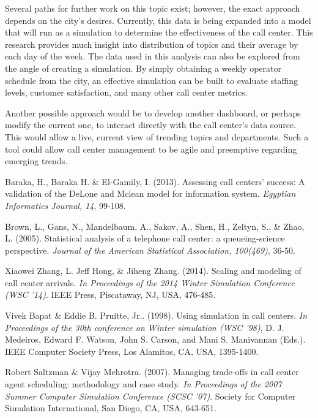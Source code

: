 \documentclass{article}
\begin{document}
Several paths for further work on this topic exist; however, the exact approach depends on the city's desires.  Currently, this data is being expanded into a model that will run as a simulation to determine the effectiveness of the call center.  This research provides much insight into distribution of topics and their average by each day of the week.  The data used in this analysis can also be explored from the angle of creating a simulation.  By simply obtaining a weekly operator schedule from the city, an effective simulation can be built to evaluate staffing levels, customer satisfaction, and many other call center metrics.
\par
Another possible approach would be to develop another dashboard, or perhaps modify the current one, to interact directly with the call center's data source.  This would allow a live, current view of trending topics and departments.  Such a tool could allow call center management to be agile and preemptive regarding emerging trends.



\begin{thebibliography}{5}

Baraka, H., Baraka H. \& El-Gamily, I. (2013). Assessing call centers' success: A validation of the DeLone and Mclean model for information system. \textit{Egyptian Informatics Journal, 14}, 99-108.

Brown, L., Gans, N., Mandelbaum, A., Sakov, A., Shen, H., Zeltyn, S., \& Zhao, L. (2005). Statistical analysis of a telephone call center: a queueing-science perspective. \textit{Journal of the American Statistical Association, 100(469)}, 36-50.

Xiaowei Zhang, L. Jeff Hong, \& Jiheng Zhang. (2014). Scaling and modeling of call center arrivals. \textit{In Proceedings of the 2014 Winter Simulation Conference (WSC '14)}. IEEE Press, Piscataway, NJ, USA, 476-485.

Vivek Bapat \& Eddie B. Pruitte, Jr.. (1998). Using simulation in call centers. \textit{In Proceedings of the 30th conference on Winter simulation (WSC '98)}, D. J. Medeiros, Edward F. Watson, John S. Carson, and Mani S. Manivannan (Eds.). IEEE Computer Society Press, Los Alamitos, CA, USA, 1395-1400.

Robert Saltzman \& Vijay Mehrotra. (2007). Managing trade-offs in call center agent scheduling: methodology and case study. \textit{In Proceedings of the 2007 Summer Computer Simulation Conference (SCSC '07)}. Society for Computer Simulation International, San Diego, CA, USA, 643-651.

\end{thebibliography}
\newpage
\end{document}
